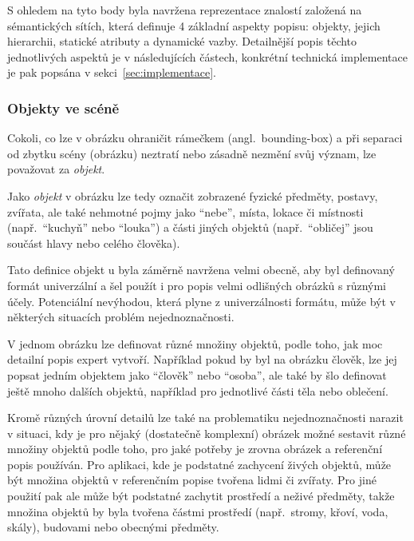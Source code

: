 
S ohledem na tyto body byla navržena reprezentace znalostí založená na sémantických sítích, která definuje 4 základní aspekty popisu: objekty, jejich hierarchii,
statické atributy a dynamické vazby.
Detailnější popis těchto jednotlivých aspektů je v následujících částech, konkrétní technická implementace je pak popsána v sekci~\ref{sec:implementace}.



\subsubsection{Objekty ve scéně}\label{subsubsec:objekty_ve_scene}
\newcommand{\objekt}{{\color{red!70!black}\texttt{objekt}}}
Cokoli, co lze v obrázku ohraničit rámečkem (angl.~bounding-box) a při separaci od zbytku scény (obrázku) neztratí nebo zásadně nezmění svůj význam,
lze považovat za \emph{objekt}.

Jako \emph{objekt} v obrázku lze tedy označit zobrazené fyzické předměty, postavy, zvířata, ale také nehmotné pojmy jako \enquote{nebe},
místa, lokace či místnosti (např.~\enquote{kuchyň} nebo \enquote{louka}) a části jiných objektů (např.~\enquote{obličej} jsou součást hlavy nebo celého člověka).

Tato definice objekt u byla záměrně navržena velmi obecně, aby byl definovaný formát univerzální a šel použít i pro popis velmi odlišných obrázků s různými účely.
Potenciální nevýhodou, která plyne z univerzálnosti formátu, může být v některých situacích problém nejednoznačnosti.

V jednom obrázku lze definovat různé množiny objektů, podle toho, jak moc detailní popis expert vytvoří.
Například pokud by byl na obrázku člověk, lze jej popsat jedním objektem jako \enquote{člověk} nebo \enquote{osoba},
ale také by šlo definovat ještě mnoho dalších objektů, například pro jednotlivé části těla nebo oblečení.

Kromě různých úrovní detailů lze také na problematiku nejednoznačnosti narazit v situaci, kdy je pro nějaký (dostatečně komplexní) obrázek
možné sestavit různé množiny objektů podle toho, pro jaké potřeby je zrovna obrázek a referenční popis používán.
Pro aplikaci, kde je podstatné zachycení živých objektů, může být množina objektů v referenčním popise tvořena lidmi či zvířaty.
Pro jiné použití pak ale může být podstatné zachytit prostředí a neživé předměty,
takže množina objektů by byla tvořena částmi prostředí (např.~stromy, křoví, voda, skály), budovami nebo obecnými předměty.

